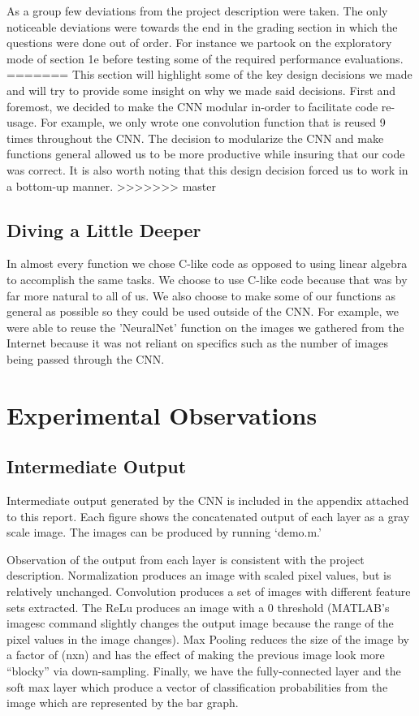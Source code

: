 \documentclass[11pt,english]{article}
\begin{document}
As a group few deviations from the project description were taken. The only noticeable deviations were towards the end in the grading section in which the questions were done out of order. For instance we partook on the exploratory mode of section 1e before testing some of the required performance evaluations.
=======
This section will highlight some of the key design decisions we made and will try to provide some insight on why we made said decisions. First and foremost, we decided to make the CNN modular in-order to facilitate code re-usage. For example, we only wrote one convolution function that is reused 9 times throughout the CNN. The decision to modularize the CNN and make functions general allowed us to be more productive while insuring that our code was correct. It is also worth noting that this design decision forced us to work in a bottom-up manner.
>>>>>>> master

\newpage


\subsection{Diving a Little Deeper}
In almost every function we chose C-like code as opposed to using linear algebra to accomplish the same tasks. We choose to use C-like code because that was by far more natural to all of us. We also choose to make some of our functions as general as possible so they could be used outside of the CNN. For example, we were able to reuse the 'NeuralNet' function on the images we gathered from the Internet because it was not reliant on specifics such as the number of images being passed through the CNN.

\section{Experimental Observations}

\subsection{Intermediate Output}

Intermediate output generated by the CNN is included in the appendix attached to this report.  Each figure shows the concatenated output of each layer as a gray scale image.  The images can be produced by running `demo.m.'

Observation of the output from each layer is consistent with the project description.  Normalization produces an image with scaled pixel values, but is relatively unchanged.  Convolution produces a set of images with different feature sets extracted.  The ReLu produces an image with a 0 threshold (MATLAB's imagesc command slightly changes the output image because the range of the pixel values in the image changes).  Max Pooling reduces the size of the image by a factor of (nxn) and has the effect of making the previous image look more ``blocky'' via down-sampling.  Finally, we have the fully-connected layer and the soft max layer which produce a vector of classification probabilities from the image which are represented by the bar graph.
\end{document}
